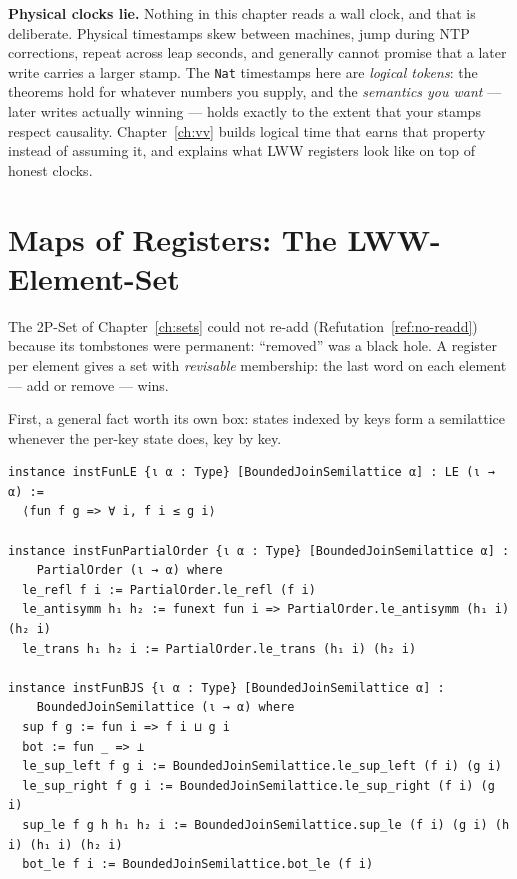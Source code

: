 \documentclass[12pt, a4paper, openright]{book}
\theoremstyle{thmstyle}
\theoremstyle{defstyle}
\newcommand{\lc}[1]{\texttt{#1}}
\newenvironment{notebox}{%
  \begin{tcolorbox}[notebox]%
}{\end{tcolorbox}}
\begin{document}
\begin{notebox}
  \textbf{Physical clocks lie.} Nothing in this chapter reads a wall
  clock, and that is deliberate. Physical timestamps skew between
  machines, jump during NTP corrections, repeat across leap seconds, and
  generally cannot promise that a later write carries a larger stamp.
  The \lc{Nat} timestamps here are \emph{logical tokens}: the theorems
  hold for whatever numbers you supply, and the \emph{semantics you
  want} --- later writes actually winning --- holds exactly to the extent
  that your stamps respect causality. Chapter~\ref{ch:vv} builds logical
  time that earns that property instead of assuming it, and explains
  what LWW registers look like on top of honest clocks.
\end{notebox}

\section{Maps of Registers: The LWW-Element-Set}
\label{sec:lww-eset}

The 2P-Set of Chapter~\ref{ch:sets} could not re-add
(Refutation~\ref{ref:no-readd}) because its tombstones were permanent:
``removed'' was a black hole. A register per element gives a set with
\emph{revisable} membership: the last word on each element --- add or
remove --- wins.

First, a general fact worth its own box: states indexed by keys form a
semilattice whenever the per-key state does, key by key.

\begin{verbatim}
instance instFunLE {ι α : Type} [BoundedJoinSemilattice α] : LE (ι → α) :=
  ⟨fun f g => ∀ i, f i ≤ g i⟩

instance instFunPartialOrder {ι α : Type} [BoundedJoinSemilattice α] :
    PartialOrder (ι → α) where
  le_refl f i := PartialOrder.le_refl (f i)
  le_antisymm h₁ h₂ := funext fun i => PartialOrder.le_antisymm (h₁ i) (h₂ i)
  le_trans h₁ h₂ i := PartialOrder.le_trans (h₁ i) (h₂ i)

instance instFunBJS {ι α : Type} [BoundedJoinSemilattice α] :
    BoundedJoinSemilattice (ι → α) where
  sup f g := fun i => f i ⊔ g i
  bot := fun _ => ⊥
  le_sup_left f g i := BoundedJoinSemilattice.le_sup_left (f i) (g i)
  le_sup_right f g i := BoundedJoinSemilattice.le_sup_right (f i) (g i)
  sup_le f g h h₁ h₂ i := BoundedJoinSemilattice.sup_le (f i) (g i) (h i) (h₁ i) (h₂ i)
  bot_le f i := BoundedJoinSemilattice.bot_le (f i)
\end{verbatim}
\end{document}
